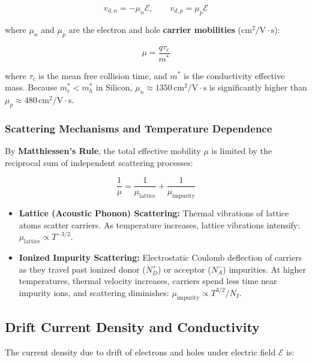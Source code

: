 \documentclass[12pt,a4paper]{article}
\begin{document}
\begin{equation}
  v_{d,n} = -\mu_n \mathcal{E}, \qquad v_{d,p} = \mu_p \mathcal{E}
\end{equation}

where $\mu_n$ and $\mu_p$ are the electron and hole \textbf{carrier mobilities} ($\text{cm}^2/\text{V}\cdot\text{s}$):

\begin{equation}
  \mu = \frac{q \tau_c}{m^*}
\end{equation}

where $\tau_c$ is the mean free collision time, and $m^*$ is the conductivity effective mass. Because $m_e^* < m_h^*$ in Silicon, $\mu_n \approx 1350\,\text{cm}^2/\text{V}\cdot\text{s}$ is significantly higher than $\mu_p \approx 480\,\text{cm}^2/\text{V}\cdot\text{s}$.

\subsubsection{Scattering Mechanisms and Temperature Dependence}
By \textbf{Matthiessen's Rule}, the total effective mobility $\mu$ is limited by the reciprocal sum of independent scattering processes:

\begin{equation}
  \frac{1}{\mu} = \frac{1}{\mu_{\text{lattice}}} + \frac{1}{\mu_{\text{impurity}}}
\end{equation}

\begin{itemize}[leftmargin=*, itemsep=3pt]
  \item \textbf{Lattice (Acoustic Phonon) Scattering:} Thermal vibrations of lattice atoms scatter carriers. As temperature increases, lattice vibrations intensify: $\mu_{\text{lattice}} \propto T^{-3/2}$.
  \item \textbf{Ionized Impurity Scattering:} Electrostatic Coulomb deflection of carriers as they travel past ionized donor ($N_D^+$) or acceptor ($N_A^-$) impurities. At higher temperatures, thermal velocity increases, carriers spend less time near impurity ions, and scattering diminishes: $\mu_{\text{impurity}} \propto T^{3/2} / N_I$.
\end{itemize}

\subsection{Drift Current Density and Conductivity}
The current density due to drift of electrons and holes under electric field $\mathcal{E}$ is:
\end{document}
